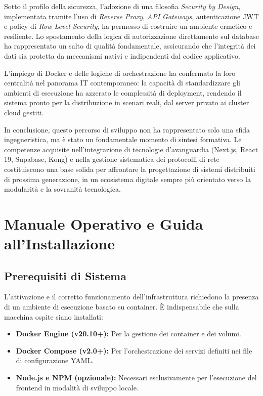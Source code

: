 \documentclass[12pt,a4paper]{report}
\begin{document}
Sotto il profilo della sicurezza, l'adozione di una filosofia
\textit{Security by Design}, implementata tramite l'uso di
\textit{Reverse Proxy}, \textit{API Gateways}, autenticazione JWT e
policy di \textit{Row Level Security}, ha permesso di costruire un
ambiente ermetico e resiliente. Lo spostamento della logica di
autorizzazione direttamente sul database ha rappresentato un salto di
qualità fondamentale, assicurando che l'integrità dei dati sia
protetta da meccanismi nativi e indipendenti dal codice applicativo.

L'impiego di Docker e delle logiche di orchestrazione ha confermato
la loro centralità nel panorama IT contemporaneo: la capacità di
standardizzare gli ambienti di esecuzione ha azzerato le complessità
di deployment, rendendo il sistema pronto per la distribuzione in
scenari reali, dal server privato ai cluster cloud gestiti.

In conclusione, questo percorso di sviluppo non ha rappresentato solo
una sfida ingegneristica, ma è stato un fondamentale momento di
sintesi formativa. Le competenze acquisite nell'integrazione di
tecnologie d'avanguardia (Next.js, React 19, Supabase, Kong) e nella
gestione sistematica dei protocolli di rete costituiscono una base
solida per affrontare la progettazione di sistemi distribuiti di
prossima generazione, in un ecosistema digitale sempre più orientato
verso la modularità e la sovranità tecnologica.

\appendix
\chapter{Manuale Operativo e Guida all'Installazione}
\label{app:user_guide}

\section{Prerequisiti di Sistema}
L'attivazione e il corretto funzionamento dell'infrastruttura richiedono la
presenza di un ambiente di esecuzione basato su container. È indispensabile
che sulla macchina ospite siano installati:
\begin{itemize}
  \item \textbf{Docker Engine (v20.10+):} Per la gestione dei container e dei
    volumi.
  \item \textbf{Docker Compose (v2.0+):} Per l'orchestrazione dei servizi
    definiti nei file di configurazione YAML.
  \item \textbf{Node.js e NPM (opzionale):} Necessari esclusivamente per
    l'esecuzione del frontend in modalità di sviluppo locale.
\end{itemize}
\end{document}
